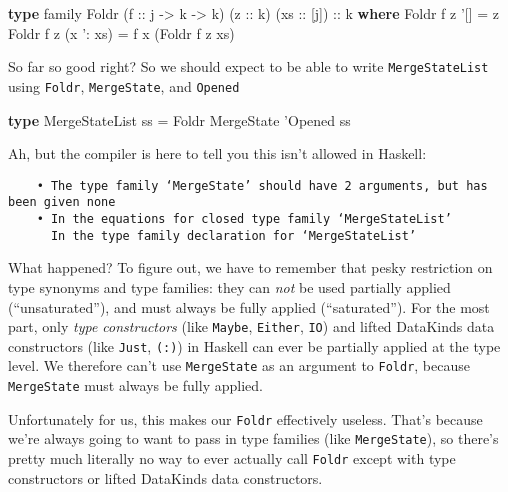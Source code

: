 \documentclass[]{article}
\newenvironment{Shaded}{}{}
\newcommand{\DataTypeTok}[1]{\textcolor[rgb]{0.56,0.13,0.00}{#1}}
\newcommand{\FunctionTok}[1]{\textcolor[rgb]{0.02,0.16,0.49}{#1}}
\newcommand{\KeywordTok}[1]{\textcolor[rgb]{0.00,0.44,0.13}{\textbf{#1}}}
\newcommand{\NormalTok}[1]{#1}
\newcommand{\OtherTok}[1]{\textcolor[rgb]{0.00,0.44,0.13}{#1}}
\begin{document}
\begin{Shaded}
\begin{Highlighting}[]
\KeywordTok{type}\NormalTok{ family }\DataTypeTok{Foldr}\NormalTok{ (}\OtherTok{f ::}\NormalTok{ j }\OtherTok{->}\NormalTok{ k }\OtherTok{->}\NormalTok{ k) (}\OtherTok{z ::}\NormalTok{ k) (}\OtherTok{xs ::}\NormalTok{ [j])}\OtherTok{ ::}\NormalTok{ k }\KeywordTok{where}
    \DataTypeTok{Foldr}\NormalTok{ f z '[]       }\FunctionTok{=}\NormalTok{ z}
    \DataTypeTok{Foldr}\NormalTok{ f z (x '}\FunctionTok{:}\NormalTok{ xs) }\FunctionTok{=}\NormalTok{ f x (}\DataTypeTok{Foldr}\NormalTok{ f z xs)}
\end{Highlighting}
\end{Shaded}

So far so good right? So we should expect to be able to write
\texttt{MergeStateList} using \texttt{Foldr}, \texttt{MergeState}, and
\texttt{\textquotesingle{}Opened}

\begin{Shaded}
\begin{Highlighting}[]
\KeywordTok{type} \DataTypeTok{MergeStateList}\NormalTok{ ss }\FunctionTok{=} \DataTypeTok{Foldr} \DataTypeTok{MergeState}\NormalTok{ '}\DataTypeTok{Opened}\NormalTok{ ss}
\end{Highlighting}
\end{Shaded}

Ah, but the compiler is here to tell you this isn't allowed in Haskell:

\begin{verbatim}
    • The type family ‘MergeState’ should have 2 arguments, but has been given none
    • In the equations for closed type family ‘MergeStateList’
      In the type family declaration for ‘MergeStateList’
\end{verbatim}

What happened? To figure out, we have to remember that pesky restriction on type
synonyms and type families: they can \emph{not} be used partially applied
(``unsaturated''), and must always be fully applied (``saturated''). For the
most part, only \emph{type constructors} (like \texttt{Maybe}, \texttt{Either},
\texttt{IO}) and lifted DataKinds data constructors (like
\texttt{\textquotesingle{}Just}, \texttt{\textquotesingle{}(:)}) in Haskell can
ever be partially applied at the type level. We therefore can't use
\texttt{MergeState} as an argument to \texttt{Foldr}, because
\texttt{MergeState} must always be fully applied.

Unfortunately for us, this makes our \texttt{Foldr} effectively useless. That's
because we're always going to want to pass in type families (like
\texttt{MergeState}), so there's pretty much literally no way to ever actually
call \texttt{Foldr} except with type constructors or lifted DataKinds data
constructors.
\end{document}
